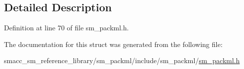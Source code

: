 \subsection{Detailed Description}


Definition at line 70 of file sm\+\_\+packml.\+h.



The documentation for this struct was generated from the following file\+:\begin{DoxyCompactItemize}
\item 
smacc\+\_\+sm\+\_\+reference\+\_\+library/sm\+\_\+packml/include/sm\+\_\+packml/\hyperlink{sm__packml_8h}{sm\+\_\+packml.\+h}\end{DoxyCompactItemize}
